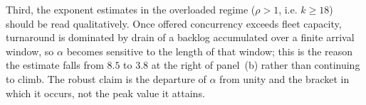 Third, the exponent estimates in the overloaded regime ($\rho > 1$, i.e.
$k \geq 18$) should be read qualitatively. Once offered concurrency exceeds
fleet capacity, turnaround is dominated by drain of a backlog accumulated over
a finite arrival window, so $\alpha$ becomes sensitive to the length of that
window; this is the reason the estimate falls from $8.5$ to $3.8$ at the right
of panel~(b) rather than continuing to climb. The robust claim is the departure
of $\alpha$ from unity and the bracket in which it occurs, not the peak value
it attains.
